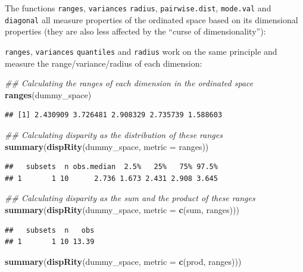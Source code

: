 \documentclass[
]{book}
\newenvironment{Shaded}{\begin{snugshade}}{\end{snugshade}}
\newcommand{\CommentTok}[1]{\textcolor[rgb]{0.56,0.35,0.01}{\textit{#1}}}
\newcommand{\DataTypeTok}[1]{\textcolor[rgb]{0.13,0.29,0.53}{#1}}
\newcommand{\KeywordTok}[1]{\textcolor[rgb]{0.13,0.29,0.53}{\textbf{#1}}}
\newcommand{\NormalTok}[1]{#1}
\begin{document}
The functions \texttt{ranges}, \texttt{variances} \texttt{radius}, \texttt{pairwise.dist}, \texttt{mode.val} and \texttt{diagonal} all measure properties of the ordinated space based on its dimensional properties (they are also less affected by the ``curse of dimensionality''):

\texttt{ranges}, \texttt{variances} \texttt{quantiles} and \texttt{radius} work on the same principle and measure the range/variance/radius of each dimension:

\begin{Shaded}
\begin{Highlighting}[]
\CommentTok{\#\# Calculating the ranges of each dimension in the ordinated space}
\KeywordTok{ranges}\NormalTok{(dummy\_space)}
\end{Highlighting}
\end{Shaded}

\begin{verbatim}
## [1] 2.430909 3.726481 2.908329 2.735739 1.588603
\end{verbatim}

\begin{Shaded}
\begin{Highlighting}[]
\CommentTok{\#\# Calculating disparity as the distribution of these ranges}
\KeywordTok{summary}\NormalTok{(}\KeywordTok{dispRity}\NormalTok{(dummy\_space, }\DataTypeTok{metric =}\NormalTok{ ranges))}
\end{Highlighting}
\end{Shaded}

\begin{verbatim}
##   subsets  n obs.median  2.5%   25%   75% 97.5%
## 1       1 10      2.736 1.673 2.431 2.908 3.645
\end{verbatim}

\begin{Shaded}
\begin{Highlighting}[]
\CommentTok{\#\# Calculating disparity as the sum and the product of these ranges}
\KeywordTok{summary}\NormalTok{(}\KeywordTok{dispRity}\NormalTok{(dummy\_space, }\DataTypeTok{metric =} \KeywordTok{c}\NormalTok{(sum, ranges)))}
\end{Highlighting}
\end{Shaded}

\begin{verbatim}
##   subsets  n   obs
## 1       1 10 13.39
\end{verbatim}

\begin{Shaded}
\begin{Highlighting}[]
\KeywordTok{summary}\NormalTok{(}\KeywordTok{dispRity}\NormalTok{(dummy\_space, }\DataTypeTok{metric =} \KeywordTok{c}\NormalTok{(prod, ranges)))}
\end{Highlighting}
\end{Shaded}
\end{document}
